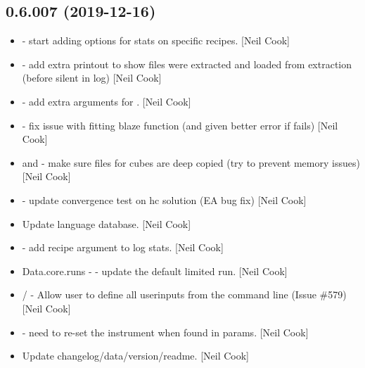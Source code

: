 \documentclass[a4paper,10pt,english]{report}
\begin{document}
\subsection{0.6.007 (2019-12-16)}
\label{\detokenize{misc/changelog:id12}}\begin{itemize}
\item {} 
 - start adding options for stats on
specific recipes. {[}Neil Cook{]}

\item {} 
 - add extra printout to show files were
extracted and loaded from extraction (before silent in log) {[}Neil
Cook{]}

\item {} 
 - add extra arguments for
. {[}Neil Cook{]}

\item {} 
 - fix issue with fitting blaze function
(and given better error if  fails) {[}Neil Cook{]}

\item {} 
 and  - make sure files for
cubes are deep copied (try to prevent memory issues) {[}Neil Cook{]}

\item {} 
 - update convergence test on hc solution (EA bug
fix) {[}Neil Cook{]}

\item {} 
Update language database. {[}Neil Cook{]}

\item {} 
 - add recipe argument
to log stats. {[}Neil Cook{]}

\item {} 
Data.core.runs -  - update the default limited run.
{[}Neil Cook{]}

\item {} 
 /  - Allow user to define all userinputs
from the command line (Issue \#579) {[}Neil Cook{]}

\item {} 
 - need to re-set the instrument when found in params.
{[}Neil Cook{]}

\item {} 
Update changelog/data/version/readme. {[}Neil Cook{]}

\end{itemize}
\end{document}
